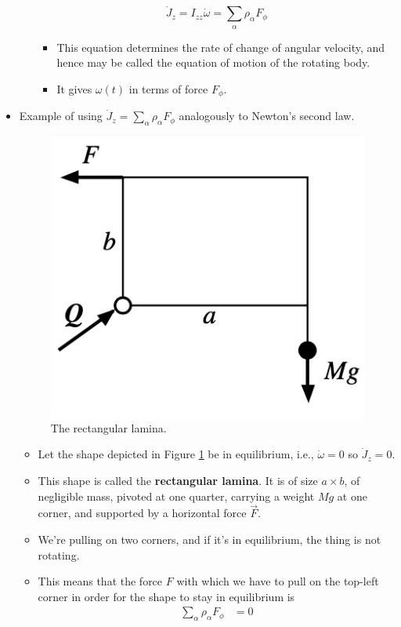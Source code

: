 \documentclass[../notes.tex]{subfiles}
\begin{document}
\begin{itemize}
\begin{itemize}
        \begin{equation*}
            \dot{J}_z = I_{zz}\dot{\omega}
            = \sum_\alpha\rho_\alpha F_\phi
        \end{equation*}
        \begin{itemize}
            \item This equation determines the rate of change of angular velocity, and hence may be called the equation of motion of the rotating body.
            \item It gives $\omega(t)$ in terms of force $F_\phi$.
        \end{itemize}
    \end{itemize}
    \item Example of using $\dot{J}_z=\sum_\alpha\rho_\alpha F_\phi$ analogously to Newton's second law.
    \begin{figure}[H]
        \centering
        \includegraphics[width=0.22\linewidth]{../ExtFiles/rectangularLamina.png}
        \caption{The rectangular lamina.}
        \label{fig:rectangularLamina}
    \end{figure}
    \begin{itemize}
        \item Let the shape depicted in Figure \ref{fig:rectangularLamina} be in equilibrium, i.e., $\dot{\omega}=0$ so $\dot{J}_z=0$.
        \item This shape is called the \textbf{rectangular lamina}. It is of size $a\times b$, of negligible mass, pivoted at one quarter, carrying a weight $Mg$ at one corner, and supported by a horizontal force $\vec{F}$.
        \item We're pulling on two corners, and if it's in equilibrium, the thing is not rotating.
        \item This means that the force $F$ with which we have to pull on the top-left corner in order for the shape to stay in equilibrium is
        \begin{align*}
            \sum_\alpha\rho_\alpha F_\phi &= 0\\

\end{align*}
\end{itemize}
\end{itemize}
\end{document}
